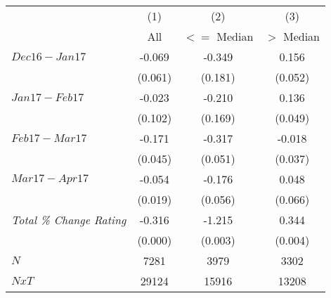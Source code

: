 \begin{center}
\begin{tabular}{lccc}
\hline  & (1) & (2) & (3)\\
 & All &  $<=$ Median  &  $>$ Median\\
\hline  $ Dec16-Jan17 $  & -0.069 & -0.349 & 0.156\\
 & (0.061) & (0.181) & (0.052)\\
 $ Jan17-Feb17 $  & -0.023 & -0.210 & 0.136\\
 & (0.102) & (0.169) & (0.049)\\
 $ Feb17-Mar17 $  & -0.171 & -0.317 & -0.018\\
 & (0.045) & (0.051) & (0.037)\\
 $ Mar17-Apr17 $  & -0.054 & -0.176 & 0.048\\
 & (0.019) & (0.056) & (0.066)\\
\hline \textit{Total \% Change Rating} & -0.316 & -1.215 & 0.344\\
  & (0.000) & (0.003) & (0.004)\\
\hline  $ N $  & 7281 & 3979 & 3302\\
 $ NxT $  & 29124 & 15916 & 13208\\
\hline\end{tabular}\\
\begin{tiny} \hfil\end{tiny}\\
\end{center}
